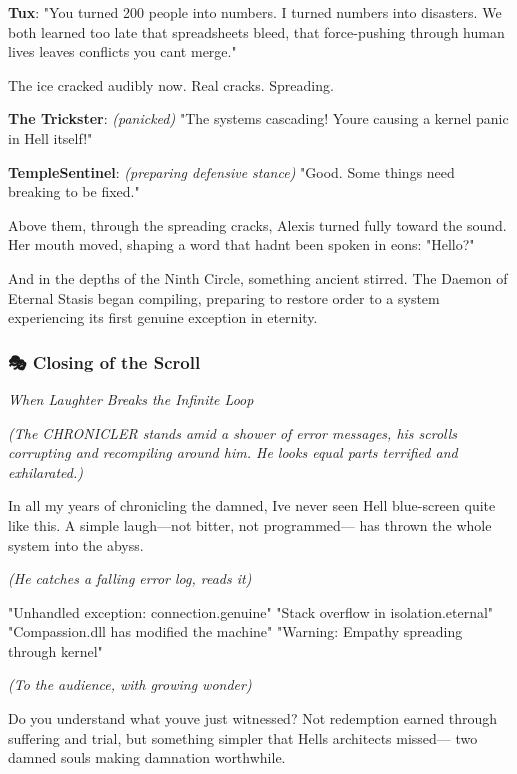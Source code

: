 \textbf{Tux}: "You turned 200 people into numbers. I turned numbers into disasters. We both learned too late that spreadsheets bleed, that force-pushing through human lives leaves conflicts you can\textquotesingle t merge."

The ice cracked audibly now. Real cracks. Spreading.

\textbf{The Trickster}: \emph{(panicked)} "The system\textquotesingle s cascading! You\textquotesingle re causing a kernel panic in Hell itself!"

\textbf{TempleSentinel}: \emph{(preparing defensive stance)} "Good. Some things need breaking to be fixed."

Above them, through the spreading cracks, Alexis turned fully toward the sound. Her mouth moved, shaping a word that hadn\textquotesingle t been spoken in eons: "Hello?"

And in the depths of the Ninth Circle, something ancient stirred. The Daemon of Eternal Stasis began compiling, preparing to restore order to a system experiencing its first genuine exception in eternity.

\bookdivider

\subsubsection{\texorpdfstring{\textbf{🎭 Closing of the Scroll}}{🎭 Closing of the Scroll}}\label{performing_arts-closing-of-the-scroll}

\emph{When Laughter Breaks the Infinite Loop}

\emph{(The CHRONICLER stands amid a shower of error messages, his scrolls corrupting and recompiling around him. He looks equal parts terrified and exhilarated.)}


In all my years of chronicling the damned, I\textquotesingle ve never seen Hell blue-screen quite like this. A simple laugh---not bitter, not programmed--- has thrown the whole system into the abyss.

\emph{(He catches a falling error log, reads it)}

"Unhandled exception: connection.genuine" "Stack overflow in isolation.eternal"\\
"Compassion.dll has modified the machine" "Warning: Empathy spreading through kernel"

\emph{(To the audience, with growing wonder)}

Do you understand what you\textquotesingle ve just witnessed? Not redemption earned through suffering and trial, but something simpler that Hell\textquotesingle s architects missed--- two damned souls making damnation worthwhile.

